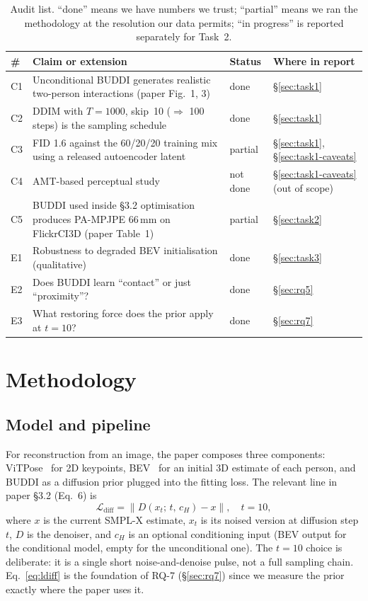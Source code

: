 \documentclass[10pt]{article}
\begin{document}
\begin{table}[H]
\centering
\small
\begin{tabular}{p{0.6cm}p{6.7cm}p{1.3cm}p{4.5cm}}
\toprule
\# & Claim or extension & Status & Where in report \\
\midrule
C1 & Unconditional BUDDI generates realistic two-person interactions (paper Fig.~1, 3) & done & \S\ref{sec:task1} \\
C2 & DDIM with $T{=}1000$, skip~10 ($\Rightarrow$ 100 steps) is the sampling schedule & done & \S\ref{sec:task1} \\
C3 & FID 1.6 against the 60/20/20 training mix using a released autoencoder latent & partial & \S\ref{sec:task1}, \S\ref{sec:task1-caveats} \\
C4 & AMT-based perceptual study & not done & \S\ref{sec:task1-caveats} (out of scope) \\
C5 & BUDDI used inside §3.2 optimisation produces PA-MPJPE 66\,mm on FlickrCI3D (paper Table~1) & partial & \S\ref{sec:task2} \\
E1 & Robustness to degraded BEV initialisation (qualitative) & done & \S\ref{sec:task3} \\
E2 & Does BUDDI learn ``contact'' or just ``proximity''? & done & \S\ref{sec:rq5} \\
E3 & What restoring force does the prior apply at $t{=}10$? & done & \S\ref{sec:rq7} \\
\bottomrule
\end{tabular}
\caption{Audit list. ``done'' means we have numbers we trust; ``partial'' means we ran the methodology at the resolution our data permits; ``in progress'' is reported separately for Task~2.}
\label{tab:claims}
\end{table}

\section{Methodology}

\subsection{Model and pipeline}

For reconstruction from an image, the paper composes three components:
ViTPose~\citep{xu2022vitpose} for 2D keypoints, BEV~\citep{sun2022bev} for an initial 3D estimate of each person, and BUDDI as a diffusion prior plugged into the fitting loss. The relevant line in paper §3.2 (Eq.~6) is
\begin{equation}
\mathcal{L}_{\mathrm{diff}} = \big\lVert D\!\left(x_t;\, t,\, c_H\right) - x \big\rVert,\quad t = 10,
\label{eq:ldiff}
\end{equation}
where $x$ is the current SMPL-X estimate, $x_t$ is its noised version at diffusion step $t$, $D$ is the denoiser, and $c_H$ is an optional conditioning input (BEV output for the conditional model, empty for the unconditional one). The $t{=}10$ choice is deliberate: it is a single short noise-and-denoise pulse, not a full sampling chain. Eq.~\ref{eq:ldiff} is the foundation of RQ-7 (\S\ref{sec:rq7}) since we measure the prior exactly where the paper uses it.
\end{document}
